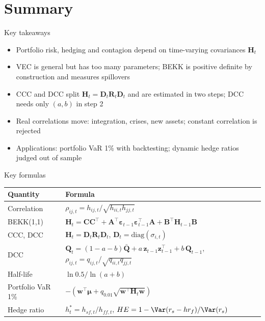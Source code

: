 \section{Summary}

\begin{frame}{Key takeaways}
\itemsize{\small}
\begin{itemize}
    \item Portfolio risk, hedging and contagion depend on time-varying covariances $\mathbf{H}_t$
    \item VEC is general but has too many parameters; BEKK is positive definite by construction and measures spillovers
    \item CCC and DCC split $\mathbf{H}_t = \mathbf{D}_t\mathbf{R}_t\mathbf{D}_t$ and are estimated in two steps; DCC needs only $(a, b)$ in step 2
    \item Real correlations move: integration, crises, new assets; constant correlation is rejected
    \item Applications: portfolio VaR 1\% with backtesting; dynamic hedge ratios judged out of sample
\end{itemize}
\end{frame}

\begin{frame}{Key formulas}
\itemsize{\small}
{\renewcommand{\arraystretch}{1.35}\begin{center}
\footnotesize
\begin{tabular}{ll}
\toprule
\textbf{Quantity} & \textbf{Formula} \\
\midrule
Correlation & $\rho_{ij,t} = h_{ij,t}/\sqrt{h_{ii,t}h_{jj,t}}$ \\
BEKK(1,1) & $\mathbf{H}_t = \mathbf{C}\mathbf{C}^\top + \mathbf{A}^\top\boldsymbol{\varepsilon}_{t-1}\boldsymbol{\varepsilon}_{t-1}^\top\mathbf{A} + \mathbf{B}^\top\mathbf{H}_{t-1}\mathbf{B}$ \\
CCC, DCC & $\mathbf{H}_t = \mathbf{D}_t\mathbf{R}_t\mathbf{D}_t$, \quad $\mathbf{D}_t = \mathrm{diag}(\sigma_{i,t})$ \\
DCC & $\mathbf{Q}_t = (1 - a - b)\bar{\mathbf{Q}} + a\,\mathbf{z}_{t-1}\mathbf{z}_{t-1}^\top + b\,\mathbf{Q}_{t-1}$, \quad $\rho_{ij,t} = q_{ij,t}/\sqrt{q_{ii,t}q_{jj,t}}$ \\
Half-life & $\ln 0.5/\ln(a + b)$ \\
Portfolio VaR 1\% & $-(\mathbf{w}^\top\boldsymbol{\mu} + q_{0.01}\sqrt{\mathbf{w}^\top\mathbf{H}_t\mathbf{w}})$ \\
Hedge ratio & $h_t^* = h_{sf,t}/h_{ff,t}$, \quad $HE = 1 - \Var(r_s - h r_f)/\Var(r_s)$ \\
\bottomrule
\end{tabular}
\end{center}
}
\end{frame}


